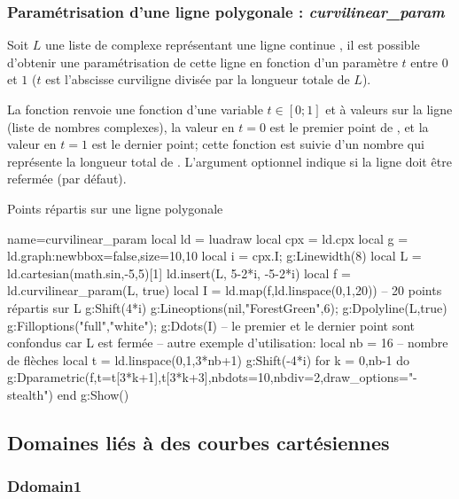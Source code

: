 \subsubsection{Paramétrisation d'une ligne polygonale : \emph{curvilinear\_param}}
Soit $L$ une liste de complexe représentant une ligne \og continue \fg, il est possible d'obtenir une paramétrisation de cette ligne en fonction d'un paramètre $t$ entre $0$ et $1$ ($t$ est l'abscisse curviligne divisée par la longueur totale de $L$).

La fonction  renvoie une fonction d'une variable $t\in[0;1]$ et à valeurs sur la ligne  (liste de nombres complexes), la valeur en $t=0$ est le premier point de , et la valeur en $t=1$ est le dernier point; cette fonction est suivie d'un nombre qui représente la longueur total de . L'argument optionnel  indique si la ligne  doit être refermée (\false par défaut).

\begin{demo}{Points répartis sur une ligne polygonale}
\begin{luadraw}{name=curvilinear_param}
local ld = luadraw
local cpx = ld.cpx
local g = ld.graph:new{bbox=false,size={10,10}}
local i = cpx.I; g:Linewidth(8)
local L = ld.cartesian(math.sin,-5,5)[1]
ld.insert(L, {5-2*i, -5-2*i})
local f = ld.curvilinear_param(L, true)
local I = ld.map(f,ld.linspace(0,1,20)) -- 20 points répartis sur L
g:Shift(4*i)
g:Lineoptions(nil,"ForestGreen",6); g:Dpolyline(L,true)
g:Filloptions("full","white"); g:Ddots(I) -- le premier et le dernier point sont confondus car L est fermée
-- autre exemple d'utilisation:
local nb = 16 -- nombre de flèches
local t = ld.linspace(0,1,3*nb+1)
g:Shift(-4*i)
for k = 0,nb-1 do
g:Dparametric(f,{t={t[3*k+1],t[3*k+3]},nbdots=10,nbdiv=2,draw_options="-stealth"})
end
g:Show()
\end{luadraw}
\end{demo}


\subsection{Domaines liés à des courbes cartésiennes}

\subsubsection{Ddomain1}

